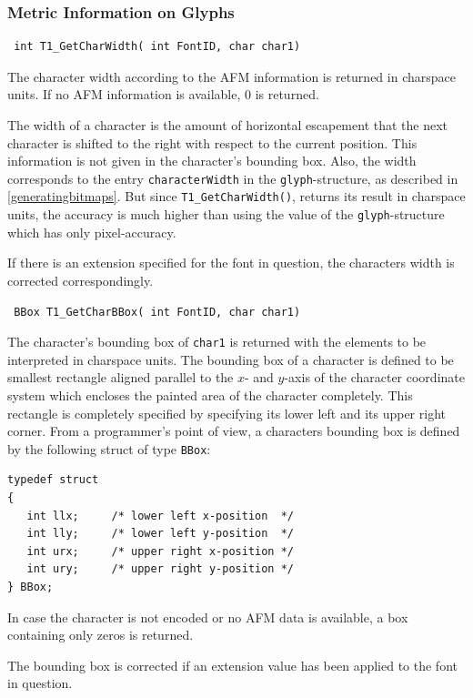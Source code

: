 \subsubsection{Metric Information on Glyphs}
\label{metricinformation}%
\precorr
\begin{verbatim}
 int T1_GetCharWidth( int FontID, char char1)
\end{verbatim}\postcorr
The character width according to the AFM information is returned in charspace
units. If no AFM information is available, 0 is returned. 

The width of a
character is the amount of horizontal escapement that the next character is
shifted to the right with respect to the current position. This information is
not given in the character's bounding box. Also, the width corresponds to the
entry \verb+characterWidth+ in the \verb+glyph+-structure, as described in
\ref{generatingbitmaps}. But since \verb+T1_GetCharWidth()+, returns its
result in charspace units, the accuracy is much higher than using the value
of the \verb+glyph+-structure which has only pixel-accuracy.

If there is an extension specified for the font in question, the characters
width is corrected correspondingly. 

\precorr
\begin{verbatim}
 BBox T1_GetCharBBox( int FontID, char char1)
\end{verbatim}\postcorr
The character's bounding box of \verb+char1+ is returned with the elements to
be interpreted in charspace units. The bounding box of a character is defined
to be smallest rectangle aligned parallel to the $x$- and $y$-axis of
the character 
coordinate system which encloses the painted area of the character
completely. This rectangle is completely specified by specifying its
lower left and its upper 
right corner. From a programmer's point of view, a characters bounding
box is defined by the following struct of type \verb+BBox+:
\begin{verbatim}
typedef struct
{ 
   int llx;     /* lower left x-position  */
   int lly;     /* lower left y-position  */
   int urx;     /* upper right x-position */
   int ury;     /* upper right y-position */
} BBox;
\end{verbatim}
In case the character is not encoded or no AFM data is available, a box
containing only zeros is returned.

The bounding box is corrected if an extension value has been applied
to the font in question.

